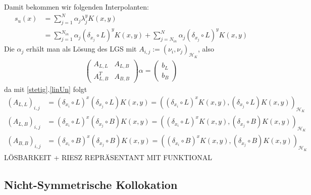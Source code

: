 Damit bekommen wir folgenden Interpolanten:
\begin{align*}
s_u(x) &= \sum_{j=1}^N \alpha_j \lambda_j^y K(x,y)\\
&= \sum_{j=1}^{N_{in}} \alpha_j (\delta_{x_j} \circ L)^y K(x,y) + \sum_{j=N_{in}}^{N} \alpha_j (\delta_{x_j} \circ L)^y K(x,y)
\end{align*}
Die $\alpha_j$ erhält man als Lösung des \ac{LGS} mit $A_{i,j} := (\nu_i,\nu_j)_{\mathcal{H}_K}$, also
\begin{align*}
\begin{pmatrix}
A_{L,L} & A_{L,B} \\ 
A_{L,B}^T & A_{B,B}
\end{pmatrix} 
\alpha =
\begin{pmatrix}
b_L \\ 
b_B
\end{pmatrix} 
\end{align*}
da mit \ref{stetig}.\ref{linUn} folgt
\begin{align*}
(A_{L,L})_{i,j} &= (\delta_{x_i} \circ L)^x(\delta_{x_j} \circ L) K(x,y) = \left((\delta_{x_i} \circ L)^x K(x,y), (\delta_{x_j} \circ L) K(x,y) \right)_{\mathcal{H}_K}\\
(A_{L,B})_{i,j} &= (\delta_{x_i} \circ L)^x(\delta_{x_j} \circ B) K(x,y) = \left((\delta_{x_i} \circ L)^x K(x,y), (\delta_{x_j} \circ B) K(x,y) \right)_{\mathcal{H}_K}\\
(A_{B,B})_{i,j} &= (\delta_{x_i} \circ B)^x(\delta_{x_j} \circ B) K(x,y) = \left((\delta_{x_i} \circ B)^x K(x,y), (\delta_{x_j} \circ B) K(x,y) \right)_{\mathcal{H}_K}
\end{align*}
LÖSBARKEIT + RIESZ REPRÄSENTANT MIT FUNKTIONAL
\subsection{Nicht-Symmetrische Kollokation}